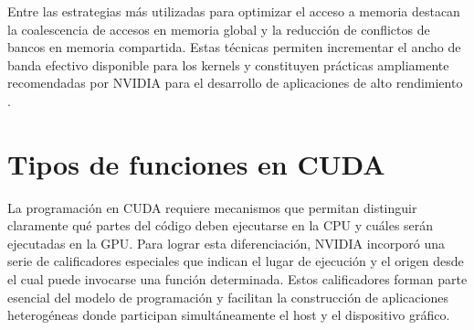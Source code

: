 Entre las estrategias más utilizadas para optimizar el acceso a memoria destacan la coalescencia de accesos en memoria global y la reducción de conflictos de bancos en memoria compartida. Estas técnicas permiten incrementar el ancho de banda efectivo disponible para los kernels y constituyen prácticas ampliamente recomendadas por NVIDIA para el desarrollo de aplicaciones de alto rendimiento \cite{nvidiaBestPractices,cudaMemoryHierarchy}.

\section{Tipos de funciones en CUDA}

La programación en CUDA requiere mecanismos que permitan distinguir claramente qué partes del código deben ejecutarse en la CPU y cuáles serán ejecutadas en la GPU. Para lograr esta diferenciación, NVIDIA incorporó una serie de calificadores especiales que indican el lugar de ejecución y el origen desde el cual puede invocarse una función determinada. Estos calificadores forman parte esencial del modelo de programación y facilitan la construcción de aplicaciones heterogéneas donde participan simultáneamente el host y el dispositivo gráfico.

